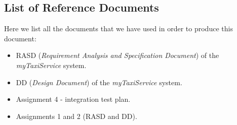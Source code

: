 \subsection{List of Reference Documents} %
\label{sub:reference_documents}
Here we list all the documents that we have used in order to produce this document:
\begin{itemize}
	\item RASD (\emph{Requirement Analysis and Specification Document}) of the \emph{myTaxiService} system.
	\item DD (\emph{Design Document}) of the \emph{myTaxiService} system.
	\item Assignment 4 - integration test plan.
	\item Assignments 1 and 2 (RASD and DD).
\end{itemize}

